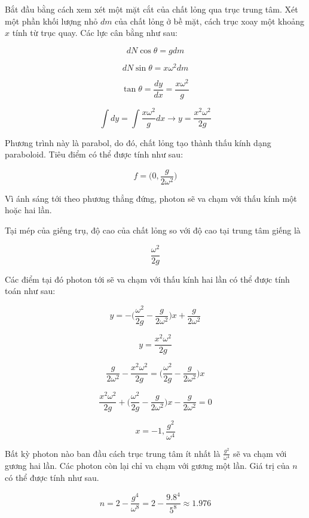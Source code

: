 \begin{solution}
    Bắt đầu bằng cách xem xét một mặt cắt của chất lỏng qua trục trung tâm. Xét một phần khối lượng nhỏ $dm$ của chất lỏng ở bề mặt, cách trục xoay một khoảng $x$ tính từ trục quay. Các lực cân bằng như sau:

$$dN\cos{\theta} = gdm$$

$$dN\sin{\theta} = x\omega^2dm$$

$$\tan{\theta} = \frac{dy}{dx} = \frac{x\omega^2}{g}$$

$$\int dy = \int\frac{x\omega^2}{g}dx\longrightarrow y = \frac{x^2\omega^2}{2g}$$

Phương trình này là parabol, do đó, chất lỏng tạo thành thấu kính dạng paraboloid. Tiêu điểm có thể được tính như sau:

$$f = \bigg(0, \frac{g}{2\omega^2}\bigg)$$

Vì ánh sáng tới theo phương thẳng đứng, photon sẽ va chạm với thấu kính một hoặc hai lần.

Tại mép của giếng trụ, độ cao của chất lỏng so với độ cao tại trung tâm giếng là

$$\frac{\omega^2}{2g}$$

Các điểm tại đó photon tới sẽ va chạm với thấu kính hai lần có thể được tính toán như sau:

$$y = -\bigg(\frac{\omega^2}{2g} - \frac{g}{2\omega^2}\bigg)x + \frac{g}{2\omega^2}$$

$$y = \frac{x^2\omega^2}{2g}$$

$$\frac{g}{2\omega^2} - \frac{x^2\omega^2}{2g} = \bigg(\frac{\omega^2}{2g} - \frac{g}{2\omega^2}\bigg)x$$

$$\frac{x^2\omega^2}{2g} + \bigg(\frac{\omega^2}{2g} - \frac{g}{2\omega^2}\bigg)x - \frac{g}{2\omega^2} = 0$$

$$x = -1, \frac{g^2}{\omega^4}$$

Bất kỳ photon nào ban đầu cách trục trung tâm ít nhất là $\frac{g^2}{\omega^4}$ sẽ va chạm với gương hai lần. Các photon còn lại chỉ va chạm với gương một lần. Giá trị của $n$ có thể được tính như sau.

$$n = 2 - \frac{g^4}{\omega^8} = 2 - \frac{9.8^4}{5^8} \approx \boxed{1.976}$$


\end{solution}
